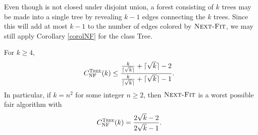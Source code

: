 \documentclass[smallextended]{svjour3}
\newcommand{\NF}{\ensuremath{\operatorname{\textsc{Next-Fit}}}\xspace}
\DeclareMathOperator{\NFm}{NF}
\begin{document}
Even though  is not closed under disjoint union, a forest consisting of $k$ trees may be made into a single tree by revealing $k-1$ edges connecting the $k$ trees. 
Since this will add at most $k-1$ to the number of edges colored
by \NF, we may still apply Corollary \ref{corolNF} for the class {\sc Tree}.

\begin{theorem}
\label{upperNFtrees}
For $k\geq 4$, 
\begin{equation*}
C_{\NFm}^{\text{{\sc Tree}}}(k)\leq\frac{\frac{k}{\lceil\sqrt{k}\rceil}+\lceil\sqrt{k}\rceil-2}{\frac{k}{\lceil\sqrt{k}\rceil}+\lceil\sqrt{k}\rceil-1}.
\end{equation*}
In particular, if $k=n^2$ for some integer $n\geq 2$, then \NF is a worst possible
fair algorithm with
\begin{equation*}
  C_{\NFm}^{\text{{\sc Tree}}}(k) = \frac{2\sqrt{k}-2}{2\sqrt{k}-1}.
\label{upperNF}
\end{equation*}
\end{theorem}
\end{document}
